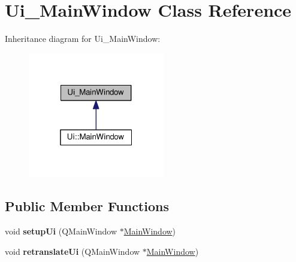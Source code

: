 \hypertarget{class_ui___main_window}{}\section{Ui\+\_\+\+Main\+Window Class Reference}
\label{class_ui___main_window}


Inheritance diagram for Ui\+\_\+\+Main\+Window\+:\nopagebreak
\begin{figure}[H]
\begin{center}
\leavevmode
\includegraphics[width=169pt]{class_ui___main_window__inherit__graph}
\end{center}
\end{figure}
\subsection*{Public Member Functions}
\begin{DoxyCompactItemize}
\item 
void {\bfseries setup\+Ui} (Q\+Main\+Window $\ast$\hyperlink{class_main_window}{Main\+Window})\hypertarget{class_ui___main_window_acf4a0872c4c77d8f43a2ec66ed849b58}{}\label{class_ui___main_window_acf4a0872c4c77d8f43a2ec66ed849b58}

\item 
void {\bfseries retranslate\+Ui} (Q\+Main\+Window $\ast$\hyperlink{class_main_window}{Main\+Window})\hypertarget{class_ui___main_window_a097dd160c3534a204904cb374412c618}{}\label{class_ui___main_window_a097dd160c3534a204904cb374412c618}

\end{DoxyCompactItemize}
